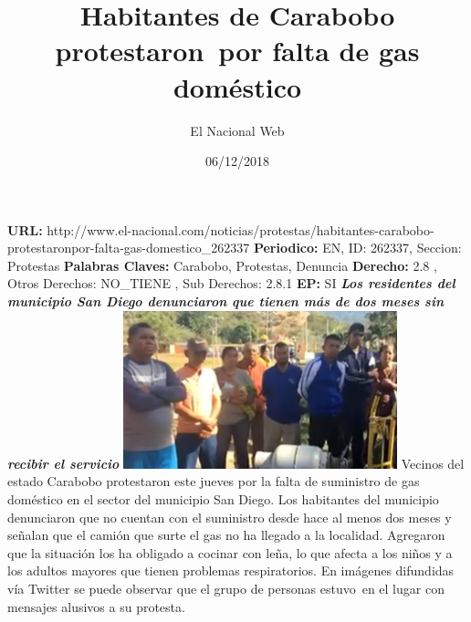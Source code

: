 \documentclass{article}%
\title{\textbf{Habitantes de Carabobo protestaron~por falta de gas doméstico}}%
\author{El Nacional Web}%
\date{06/12/2018}%
\begin{document}
%
\normalsize%
\maketitle%
\textbf{URL: }%
http://www.el{-}nacional.com/noticias/protestas/habitantes{-}carabobo{-}protestaronpor{-}falta{-}gas{-}domestico\_262337\newline%
%
\textbf{Periodico: }%
EN, %
ID: %
262337, %
Seccion: %
Protestas\newline%
%
\textbf{Palabras Claves: }%
Carabobo, Protestas, Denuncia\newline%
%
\textbf{Derecho: }%
2.8%
, Otros Derechos: %
NO\_TIENE%
, Sub Derechos: %
2.8.1%
\newline%
%
\textbf{EP: }%
SI\newline%
\newline%
%
\textbf{\textit{Los residentes del municipio San Diego denunciaron que tienen más de dos meses sin recibir el servicio}}%
\newline%
\newline%
%
\includegraphics[width=300px]{89.jpg}%
\newline%
%
Vecinos del estado Carabobo protestaron este jueves por la falta de suministro de gas doméstico en el sector del municipio San Diego.%
\newline%
%
Los habitantes del municipio denunciaron que no cuentan con el suministro desde hace al menos dos meses y señalan que el camión que surte el gas no ha llegado a la localidad.%
\newline%
%
Agregaron que la situación los ha obligado a cocinar con leña, lo que afecta a los niños y a los adultos mayores que tienen problemas respiratorios.%
\newline%
%
En imágenes difundidas vía Twitter se puede observar que el grupo de personas estuvo~en el lugar con mensajes alusivos a su protesta.%
\newline%
%
\end{document}
